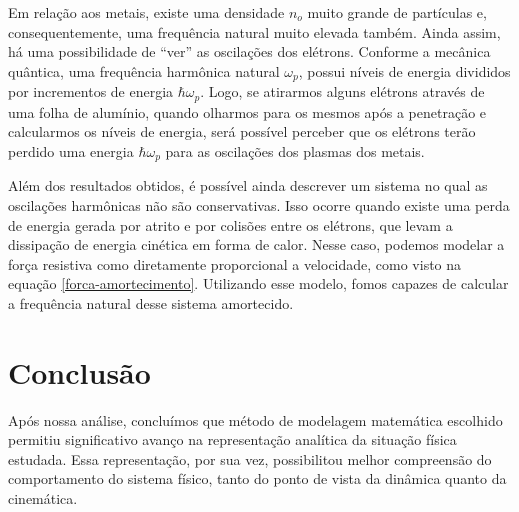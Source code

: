 \documentclass[
	article,
	11pt,
	oneside,
	a4paper,
	english,
	brazil,
	sumario=tradicional
	]{abntex2}
\begin{document}
 Em relação aos metais, existe uma densidade $n_o$ muito grande de partículas e, consequentemente, uma frequência natural muito elevada também. Ainda assim, há uma possibilidade de ``ver'' as oscilações dos elétrons. Conforme a mecânica quântica, uma frequência harmônica natural $\omega_p$, possui níveis de energia divididos por incrementos de energia $\hbar\omega_p$. Logo, se atirarmos alguns elétrons através de uma folha de alumínio, quando olharmos para os mesmos após a penetração e calcularmos os níveis de energia, será possível perceber que os elétrons terão perdido uma energia $\hbar\omega_p$ para as oscilações dos plasmas dos metais.

Além dos resultados obtidos, é possível ainda descrever um sistema no qual as oscilações harmônicas não são conservativas. Isso ocorre quando existe uma perda de energia gerada por atrito e por colisões entre os elétrons, que levam a dissipação de energia cinética em forma de calor. Nesse caso, podemos modelar a força resistiva como diretamente proporcional a velocidade, como visto na equação \ref{forca-amortecimento}. Utilizando esse modelo, fomos capazes de calcular a frequência natural desse sistema amortecido.

\section{Conclusão}

Após nossa análise, concluímos que método de modelagem matemática escolhido permitiu significativo avanço na representação analítica da situação física estudada. Essa representação, por sua vez, possibilitou melhor compreensão do comportamento do sistema físico, tanto do ponto de vista da dinâmica quanto da cinemática.

\nocite{feynman_leighton_sands_2009, halliday_resnick_walker_2008, mazur_et_al_2016}

\pagebreak
\onecolumn{
\postextual

}
\end{document}
